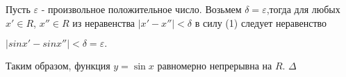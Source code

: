 \documentclass[12pt]{article}
\begin{document}
\setlength{\headsep}{0.8cm}

\pagestyle{fancy}
\fancyhf{} 
\fancyhead[C]{\fontsize{14pt}{skip}\selectfont\itshape\rightmark}

\fontsize{19pt}{19pt}
\selectfont
\setlength{\parindent}{0.8cm}

    \quad Пусть $\varepsilon$ - произвольное положительное число. Возьмем $\delta=\varepsilon$,тогда для любых $x' \in R$, $x'' \in R$ из неравенства $|x' - x''| < \delta$ в силу (1) следует неравенство
\begin{center}
    $|sinx' - sinx''| < \delta = \varepsilon.$
\end{center}
 \quad Таким образом, функция $y = \sin x$ равномерно непрерывна на $R$. $\Delta$ \\
 
\end{document}
